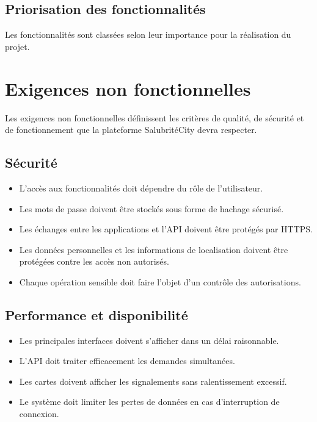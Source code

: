 \documentclass[11pt,a4paper,oneside]{report}
\begin{document}
	\subsection{Priorisation des fonctionnalités}
	
	Les fonctionnalités sont classées selon leur
	importance pour la réalisation du projet.
	

	
	\section{Exigences non fonctionnelles}
	
	Les exigences non fonctionnelles définissent les critères de qualité,
	de sécurité et de fonctionnement que la plateforme SalubritéCity
	devra respecter.
	
	\subsection{Sécurité}
	
	\begin{itemize}
		\item L'accès aux fonctionnalités doit dépendre du rôle de
		l'utilisateur.
		\item Les mots de passe doivent être stockés sous forme
		de hachage sécurisé.
		\item Les échanges entre les applications et l'API doivent
		être protégés par HTTPS.
		\item Les données personnelles et les informations de
		localisation doivent être protégées contre les accès non autorisés.
		\item Chaque opération sensible doit faire l'objet d'un contrôle
		des autorisations.
	\end{itemize}
	
	\subsection{Performance et disponibilité}
	
	\begin{itemize}
		\item Les principales interfaces doivent s'afficher dans un
		délai raisonnable.
		\item L'API doit traiter efficacement les demandes simultanées.
		\item Les cartes doivent afficher les signalements sans ralentissement
		excessif.
		\item Le système doit limiter les pertes de données en cas
		d'interruption de connexion.
	\end{itemize}
	
\end{document}
